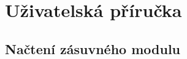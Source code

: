 

\chapter{Uživatelská příručka}
\label{priloha-prirucka}


\section{Načtení zásuvného modulu}
\label{prirucka-nacteni}


